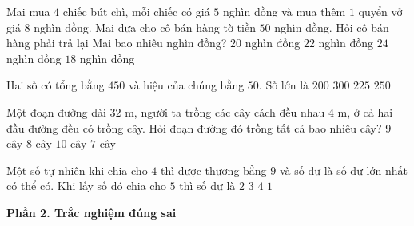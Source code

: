 \begin{ex} %
Mai mua $4$ chiếc bút chì, mỗi chiếc có giá $5$ nghìn đồng và mua thêm $1$ quyển vở giá $8$ nghìn đồng. Mai đưa cho cô bán hàng tờ tiền $50$ nghìn đồng. Hỏi cô bán hàng phải trả lại Mai bao nhiêu nghìn đồng?
\choice
{$20$ nghìn đồng}
{\True $22$ nghìn đồng}
{$24$ nghìn đồng}
{$18$ nghìn đồng}
\end{ex}

\begin{ex} %
Hai số có tổng bằng $450$ và hiệu của chúng bằng $50$. Số lớn là
\choice
{$200$}
{$300$}
{$225$}
{\True $250$}
\end{ex}

\begin{ex} %
Một đoạn đường dài $32\text{ m}$, người ta trồng các cây cách đều nhau $4\text{ m}$, ở cả hai đầu đường đều có trồng cây. Hỏi đoạn đường đó trồng tất cả bao nhiêu cây?
\choice
{\True $9$ cây}
{$8$ cây}
{$10$ cây}
{$7$ cây}
\end{ex}

\begin{ex} %
Một số tự nhiên khi chia cho $4$ thì được thương bằng $9$ và số dư là số dư lớn nhất có thể có. Khi lấy số đó chia cho $5$ thì số dư là
\choice
{$2$}
{$3$}
{\True $4$}
{$1$}
\end{ex}

\textbf{Phần 2. Trắc nghiệm đúng sai}

